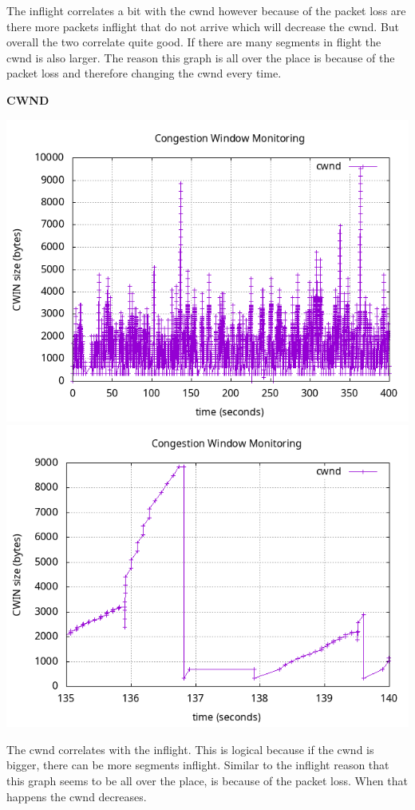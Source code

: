 \documentclass{article}
\begin{document}
The inflight correlates a bit with the cwnd however because of the packet loss are there more packets inflight that do not arrive which will decrease the cwnd. But overall the two correlate quite good. If there are many segments in flight the cwnd is also larger. The reason this graph is all over the place is because of the packet loss and therefore changing the cwnd every time. 

\textbf{CWND}

\includegraphics[scale=0.5]{plots/lab1-group5-task1-experimentB-question1.3.png}
\includegraphics[scale=0.5]{plots/lab1-group5-task1-experimentB-question1.3-xrange-135-140.png}

The cwnd correlates with the inflight. This is logical because if the cwnd is bigger, there can be more segments inflight. Similar to the inflight reason that this graph seems to be all over the place, is because of the packet loss. When that happens the cwnd decreases. 
\end{document}
